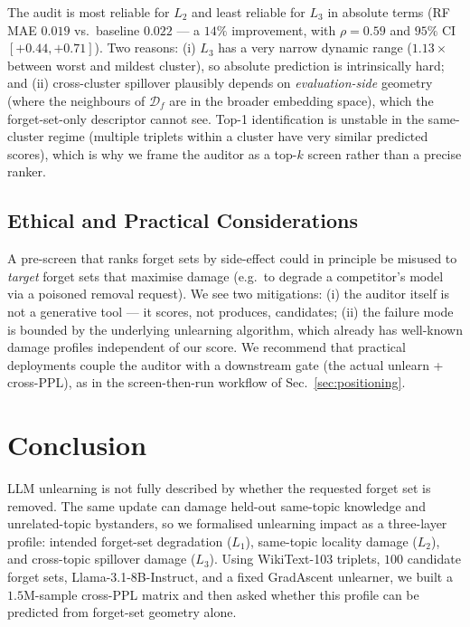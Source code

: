 \documentclass[11pt,a4paper]{article}
\newcommand{\Df}{\mathcal{D}_f}
\newcommand{\Lone}{L_1}
\newcommand{\Ltwo}{L_2}
\newcommand{\Lthree}{L_3}
\begin{document}
The audit is most reliable for $\Ltwo$ and least reliable for $\Lthree$ in absolute terms (RF MAE $0.019$ vs.\ baseline $0.022$ --- a $14\%$ improvement, with $\rho{=}0.59$ and $95\%$ CI $[+0.44, +0.71]$). Two reasons: (i) $\Lthree$ has a very narrow dynamic range ($1.13\times$ between worst and mildest cluster), so absolute prediction is intrinsically hard; and (ii) cross-cluster spillover plausibly depends on \emph{evaluation-side} geometry (where the neighbours of $\Df$ are in the broader embedding space), which the forget-set-only descriptor cannot see. Top-1 identification is unstable in the same-cluster regime (multiple triplets within a cluster have very similar predicted scores), which is why we frame the auditor as a top-$k$ screen rather than a precise ranker.

\subsection{Ethical and Practical Considerations}
\label{sec:ethics}

A pre-screen that ranks forget sets by side-effect could in principle be misused to \emph{target} forget sets that maximise damage (e.g.\ to degrade a competitor's model via a poisoned removal request). We see two mitigations: (i) the auditor itself is not a generative tool --- it scores, not produces, candidates; (ii) the failure mode is bounded by the underlying unlearning algorithm, which already has well-known damage profiles independent of our score. We recommend that practical deployments couple the auditor with a downstream gate (the actual unlearn + cross-PPL), as in the screen-then-run workflow of Sec.~\ref{sec:positioning}.

\section{Conclusion}
\label{sec:conclusion}

LLM unlearning is not fully described by whether the requested forget set is
removed. The same update can damage held-out same-topic knowledge and
unrelated-topic bystanders, so we formalised unlearning impact as a
three-layer profile: intended forget-set degradation ($\Lone$), same-topic
locality damage ($\Ltwo$), and cross-topic spillover damage ($\Lthree$). Using
WikiText-103 triplets, $100$ candidate forget sets, Llama-3.1-8B-Instruct, and
a fixed GradAscent unlearner, we built a $1.5$M-sample cross-PPL matrix and
then asked whether this profile can be predicted from forget-set geometry
alone.
\end{document}
